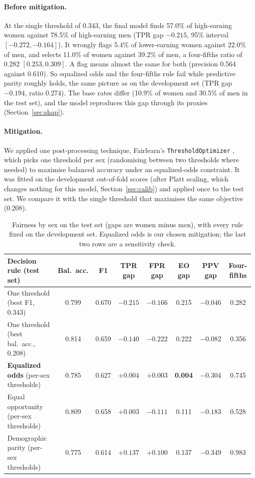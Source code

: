 \documentclass[11pt,a4paper]{article}
\newcommand{\code}[1]{\texttt{#1}}
\begin{document}
\paragraph{Before mitigation.} At the single threshold of 0.343, the final model finds 57.0\% of high-earning women against 78.5\% of high-earning men (TPR gap $-0.215$, 95\% interval $[-0.272, -0.164]$). It wrongly flags 5.4\% of lower-earning women against 22.0\% of men, and selects 11.0\% of women against 39.2\% of men, a four-fifths ratio of 0.282 $[0.253, 0.309]$. A flag means almost the same for both (precision 0.564 against 0.610). So equalized odds and the four-fifths rule fail while predictive parity roughly holds, the same picture as on the development set (TPR gap $-0.194$, ratio 0.274). The base rates differ (10.9\% of women and 30.5\% of men in the test set), and the model reproduces this gap through its proxies (Section~\ref{sec:shap}).

\paragraph{Mitigation.} We applied one post-processing technique, Fairlearn's \code{ThresholdOptimizer} \cite{weerts2023}, which picks one threshold per sex (randomising between two thresholds where needed) to maximise balanced accuracy under an equalized-odds constraint. It was fitted on the development out-of-fold scores (after Platt scaling, which changes nothing for this model, Section~\ref{sec:calib}) and applied once to the test set. We compare it with the single threshold that maximises the same objective (0.208).

\begin{table}[H]
\centering\small\setlength{\tabcolsep}{4pt}
\begin{tabular}{@{}lccccccc@{}}
\toprule
Decision rule (test set) & Bal.\ acc. & F1 & TPR gap & FPR gap & EO gap & PPV gap & Four-fifths \\
\midrule
One threshold (best F1, 0.343) & 0.799 & 0.670 & $-0.215$ & $-0.166$ & 0.215 & $-0.046$ & 0.282 \\
One threshold (best bal.\ acc., 0.208) & 0.814 & 0.659 & $-0.140$ & $-0.222$ & 0.222 & $-0.082$ & 0.356 \\
\textbf{Equalized odds} (per-sex thresholds) & 0.785 & 0.627 & $+0.004$ & $+0.003$ & \textbf{0.004} & $-0.304$ & 0.745 \\
Equal opportunity (per-sex thresholds) & 0.809 & 0.658 & $+0.003$ & $-0.111$ & 0.111 & $-0.183$ & 0.528 \\
Demographic parity (per-sex thresholds) & 0.775 & 0.614 & $+0.137$ & $+0.100$ & 0.137 & $-0.349$ & 0.983 \\
\bottomrule
\end{tabular}
\caption{Fairness by sex on the test set (gaps are women minus men), with every rule fixed on the development set. Equalized odds is our chosen mitigation; the last two rows are a sensitivity check.}
\label{tab:fair}
\end{table}
\end{document}
